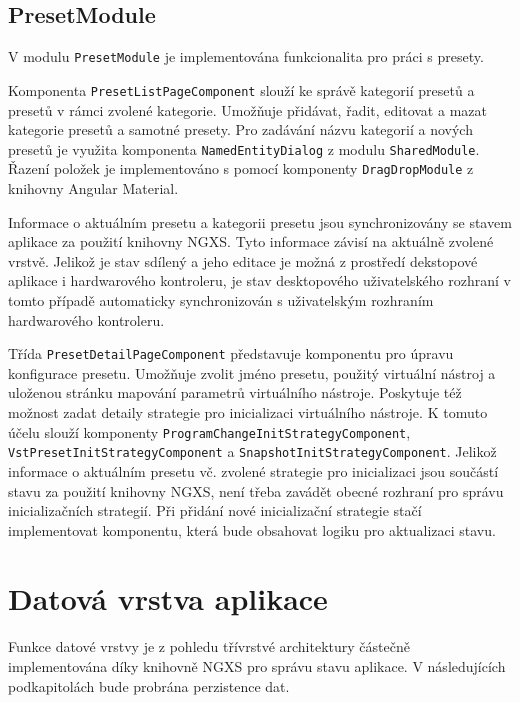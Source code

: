 \documentclass[thesis=M,czech]{FITthesis}[2019/03/06]
\begin{document}
		\subsection{PresetModule}
			V modulu \texttt{Preset\-Module} je implementována funkcionalita pro práci s presety.
			
			Komponenta \texttt{Preset\-List\-Page\-Component} slouží ke správě kategorií presetů a presetů v rámci zvolené kategorie.
			Umožňuje přidávat, řadit, editovat a mazat kategorie presetů a samotné presety. Pro zadávání názvu kategorií a nových presetů je využita komponenta \texttt{Named\-Entity\-Dialog} z modulu \texttt{SharedModule}. Řazení položek je implementováno s pomocí komponenty \texttt{Drag\-Drop\-Module} z knihovny Angular Material.

			Informace o aktuálním presetu a kategorii presetu jsou synchronizovány se stavem aplikace za použití knihovny NGXS.
			Tyto informace závisí na aktuálně zvolené vrstvě. Jelikož je stav sdílený a jeho editace je možná z prostředí dekstopové aplikace i hardwarového kontroleru, je stav desktopového uživatelského rozhraní v tomto případě automaticky synchronizován s uživatelským rozhraním hardwarového kontroleru.
			
			Třída \texttt{Preset\-Detail\-Page\-Component} představuje komponentu pro úpravu konfigurace presetu.
			Umožňuje zvolit jméno presetu, použitý virtuální nástroj a uloženou stránku mapování parametrů virtuálního nástroje.
			Poskytuje též možnost zadat detaily strategie pro inicializaci virtuálního nástroje. K tomuto účelu slouží 
			komponenty \texttt{Program\-Change\-Init\-Strategy\-Component}, \linebreak \texttt{Vst\-Preset\-Init\-Strategy\-Component} a \texttt{Snapshot\-Init\-Strategy\-Component}. Jelikož informace o aktuálním presetu vč. zvolené strategie pro inicializaci jsou součástí stavu za použití knihovny NGXS, není třeba zavádět obecné rozhraní pro správu inicializačních strategií. 
			Při přidání nové inicializační strategie stačí implementovat komponentu, která bude obsahovat logiku pro aktualizaci stavu.
			
		
	\section{Datová vrstva aplikace}
		Funkce datové vrstvy je z pohledu třívrstvé architektury částečně implementována díky knihovně NGXS pro správu stavu aplikace.
		V následujících podkapitolách bude probrána perzistence dat.
	
\end{document}
